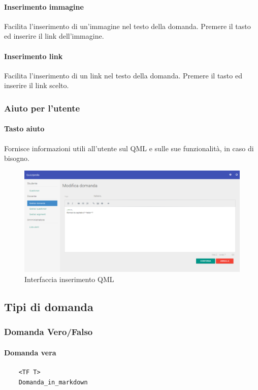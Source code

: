 \documentclass[12pt,a4paper]{article}
\begin{document}
	\paragraph{Inserimento immagine}
	Facilita l'inserimento di un'immagine nel testo della domanda. Premere il tasto ed inserire il link dell'immagine.
	\paragraph{Inserimento link}
		Facilita l'inserimento di un link nel testo della domanda. Premere il tasto ed inserire il link scelto.
   \subsubsection{Aiuto per l'utente}
	\paragraph{Tasto aiuto}
	Fornisce informazioni utili all'utente sul QML e sulle sue funzionalità, in caso di bisogno.
	\begin{figure}[H]	
		\centering
		\includegraphics[width=\linewidth]{../img/screenshot/modificaDomanda.png}
		\caption{Interfaccia inserimento QML}
		\label{Interfaccia inserimento QML}
	\end{figure}
	
	
	\subsection{Tipi di domanda}	
	\subsubsection{Domanda Vero/Falso}
	\paragraph{Domanda vera}
	\begin{verbatim}
	<TF T>
	Domanda_in_markdown
	\end{verbatim}
\end{document}

